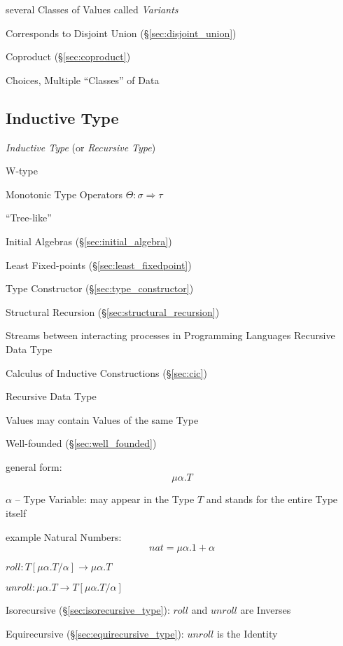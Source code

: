 several Classes of Values called \emph{Variants}

Corresponds to Disjoint Union (\S\ref{sec:disjoint_union})

Coproduct (\S\ref{sec:coproduct})

Choices, Multiple ``Classes'' of Data



\subsection{Inductive Type}\label{sec:inductive_type}

\emph{Inductive Type} (or \emph{Recursive Type})

W-type

Monotonic Type Operators $\Theta : \sigma \Rightarrow \tau$

``Tree-like''

Initial Algebras (\S\ref{sec:initial_algebra})

Least Fixed-points (\S\ref{sec:least_fixedpoint})

Type Constructor (\S\ref{sec:type_constructor})

Structural Recursion (\S\ref{sec:structural_recursion})

Streams between interacting processes in Programming Languages
Recursive Data Type

Calculus of Inductive Constructions (\S\ref{sec:cic})


\asterism

Recursive Data Type

Values may contain Values of the same Type

Well-founded (\S\ref{sec:well_founded})

general form:
\[
  \mu\alpha.T
\]

$\alpha$ -- Type Variable: may appear in the Type $T$ and stands for
the entire Type itself

example Natural Numbers:
\[
  nat = \mu\alpha.1 + \alpha
\]

$roll : T[\mu\alpha.T/\alpha] \rightarrow \mu\alpha.T$

$unroll : \mu\alpha.T \rightarrow T[\mu\alpha.T/\alpha]$

Isorecursive (\S\ref{sec:isorecursive_type}): $roll$ and $unroll$
are Inverses

Equirecursive (\S\ref{sec:equirecursive_type}): $unroll$ is the
Identity



